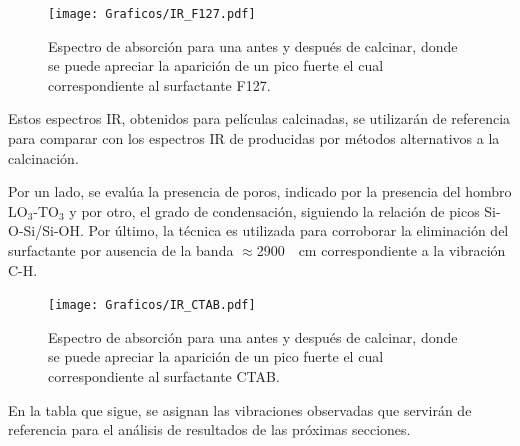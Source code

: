 				\begin{figure}[b!]
						\begin{center}
						\texttt{[image: Graficos/IR\_F127.pdf]}
						\caption[FTIR para una \pdmF.]{Espectro de absorción para una \pdmF\space antes y después de calcinar, donde se puede apreciar la aparición de un pico fuerte el cual correspondiente al surfactante F127.}
						\label{fig:IR_F127_calciando}
						\end{center}
						\end{figure}
			 
		  Estos espectros IR, obtenidos para películas calcinadas, se utilizarán de referencia para comparar con los espectros IR de \pdm\space producidas por métodos alternativos a la calcinación. 

		  \pagebreak Por un lado, se evalúa la presencia de poros, indicado por la presencia del hombro LO$_3$-TO$_3$ y  por otro, el grado de condensación, siguiendo la relación de picos Si-O-Si/Si-OH. Por último, la técnica es utilizada para corroborar la eliminación del surfactante por ausencia de la banda $\approx$\SI{2900}{\per\cm} correspondiente a la vibración C-H.

		  		\begin{figure}[h!]
						\begin{center}
						\texttt{[image: Graficos/IR\_CTAB.pdf]}
						\caption[FTIR para una \pdmC.]{Espectro de absorción para una \pdmC\space antes y después de calcinar, donde se puede apreciar la aparición de un pico fuerte el cual correspondiente al surfactante CTAB.}
						\label{fig:IR_CTAB_calcinado}
						\end{center}
						\end{figure}

		  En la tabla que sigue, se asignan las vibraciones observadas que servirán de referencia para el análisis de resultados de las próximas secciones.


